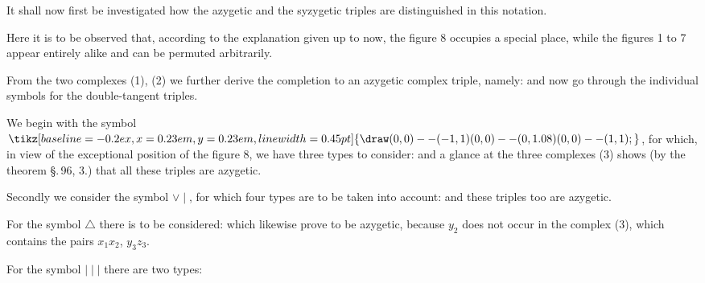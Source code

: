 \providecommand{\weberthreeup}{\mathord{\tikz[baseline=-0.2ex,x=0.23em,y=0.23em,line width=0.45pt]{\draw (0,0)--(-1,1) (0,0)--(0,1.08) (0,0)--(1,1);}}}
It shall now first be investigated how the azygetic and the syzygetic triples
are distinguished in this notation.

Here it is to be observed that, according to the explanation
given up to now, the figure 8 occupies a special place, while
the figures 1 to 7 appear entirely alike and can be permuted
arbitrarily.

From the two complexes (1), (2) we further derive the completion
 to an azygetic complex triple, namely:
and now go through the individual symbols for the double-tangent
 triples.

We begin with the symbol $\weberthreeup$, for which, in view of
the exceptional position of the figure 8, we have three types to
consider:
and a glance at the three complexes (3) shows (by the theorem
\S.\,96, 3.) that all these triples are azygetic.

Secondly we consider the symbol $\vee\mid$, for which four
types are to be taken into account:
and these triples too are azygetic.

For the symbol $\triangle$ there is to be considered:
which likewise prove to be azygetic, because $y_2$ does not occur in the complex
 (3), which contains the pairs $x_1 x_2$, $y_3 z_3$.

For the symbol $\mid\mid\mid$ there are two types:
